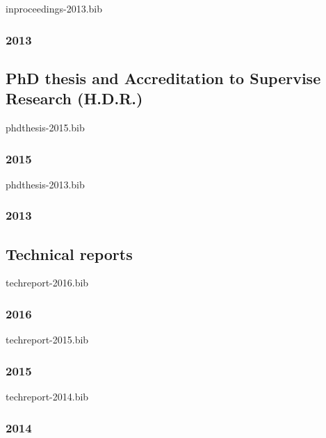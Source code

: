 \begin{btSect}{inproceedings-2013.bib}
\subsubsection*{2013}\btPrintAll
\end{btSect}

\subsection*{PhD thesis and Accreditation to Supervise Research (H.D.R.)}
\begin{btSect}{phdthesis-2015.bib}
\subsubsection*{2015}\btPrintAll
\end{btSect}

\begin{btSect}{phdthesis-2013.bib}
\subsubsection*{2013}\btPrintAll
\end{btSect}

\subsection*{Technical reports}
\begin{btSect}{techreport-2016.bib}
\subsubsection*{2016}\btPrintAll
\end{btSect}

\begin{btSect}{techreport-2015.bib}
\subsubsection*{2015}\btPrintAll
\end{btSect}

\begin{btSect}{techreport-2014.bib}
\subsubsection*{2014}\btPrintAll
\end{btSect}


